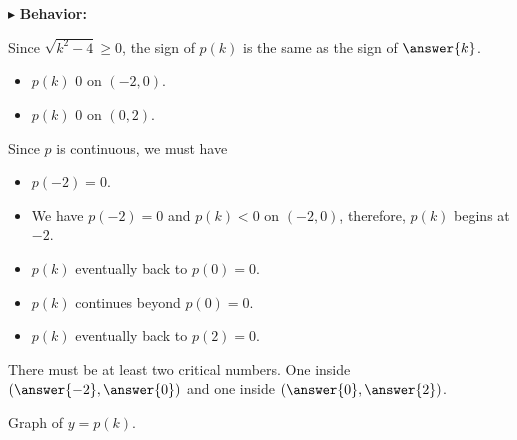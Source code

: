 \documentclass{ximera}
\begin{document}
$\blacktriangleright$ \textbf{\textcolor{blue!55!black}{Behavior:}}  



\begin{explanation}

Since $\sqrt{k^2 - 4} \geq 0$, the sign of $p(k)$ is the same as the sign of $\answer{k}$.

\begin{itemize}
\item  $p(k)$ \wordChoice{\choice[correct]{$<$} \choice{$>$}}  $0$ on $(-2, 0)$.
\item  $p(k)$ \wordChoice{\choice{$<$} \choice[correct]{$>$}}  $0$ on $(0, 2)$.
\end{itemize}


Since $p$ is continuous, we must have 


\begin{itemize}
\item  $p(-2) = 0$.
\item  We have $p(-2)=0$ and $p(k)<0$ on $(-2,0)$, therefore, $p(k)$ begins   at $-2$.
\item  $p(k)$ eventually   back to $p(0) = 0$.
\item  $p(k)$ continues   beyond $p(0) = 0$.
\item  $p(k)$ eventually   back to $p(2) = 0$.
\end{itemize}


There must be at least two critical numbers.  One inside $\left( \answer{-2}, \answer{0} \right)$ and one inside $\left( \answer{0}, \answer{2} \right)$.

\end{explanation}










Graph of $y = p(k)$.
\end{document}
